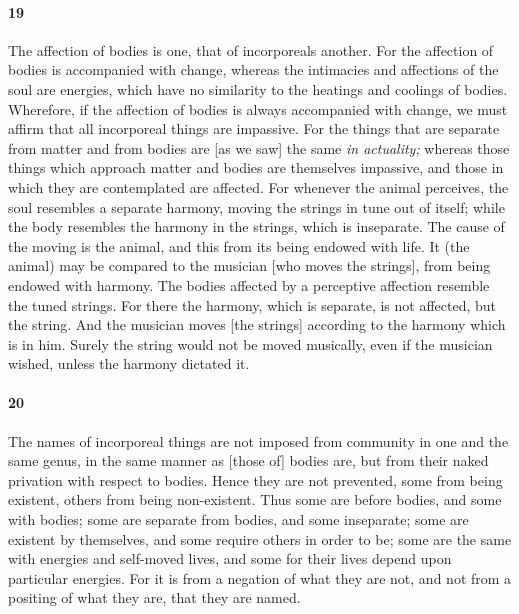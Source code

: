 \documentclass{article}
\begin{document}
\paragraph{19} The affection of bodies is one, that of incorporeals another. For the affection of bodies is accompanied with change, whereas the intimacies and affections of the soul are energies, which have no similarity to the heatings and coolings of bodies. Wherefore, if the affection of bodies is always accompanied with change, we must affirm that all incorporeal things are impassive. For the things that are separate from matter and from bodies are [as we saw] the same \textit{in actuality;} whereas those things which approach matter and bodies are themselves impassive, and those in which they are contemplated are affected. For whenever the animal perceives, the soul resembles a separate harmony, moving the strings in tune out of itself; while the body resembles the harmony in the strings, which is inseparate. The cause of the moving is the animal, and this from its being endowed with life. It (the animal) may be compared to the musician [who moves the strings], from being endowed with harmony. The bodies affected by a perceptive affection resemble the tuned strings. For there the harmony, which is separate, is not affected, but the string. And the musician moves [the strings] according to the harmony which is in him. Surely the string would not be moved musically, even if the musician wished, unless the harmony dictated it.

\paragraph{20} The names of incorporeal things are not imposed from community in one and the same genus, in the same manner as [those of] bodies are, but from their naked privation with respect to bodies. Hence they are not prevented, some from being existent, others from being non-existent. Thus some are before bodies, and some with bodies; some are separate from bodies, and some inseparate; some are existent by themselves, and some require others in order to be; some are the same with energies and self-moved lives, and some for their lives depend upon particular energies. For it is from a negation of what they are not, and not from a positing of what they are, that they are named.
\end{document}
